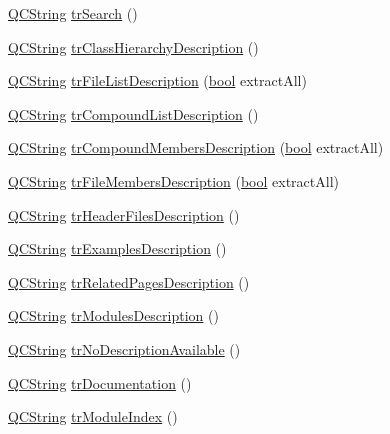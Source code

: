 \begin{DoxyCompactItemize}
\item 
\hyperlink{class_q_c_string}{Q\+C\+String} \hyperlink{class_translator_polish_abe0e787a56fad65f83063efce0ced680}{tr\+Search} ()
\item 
\hyperlink{class_q_c_string}{Q\+C\+String} \hyperlink{class_translator_polish_a853711c5e924af67e3b633ae7094fb86}{tr\+Class\+Hierarchy\+Description} ()
\item 
\hyperlink{class_q_c_string}{Q\+C\+String} \hyperlink{class_translator_polish_af5c5cd0b0e21fdd312b99ef67b923585}{tr\+File\+List\+Description} (\hyperlink{qglobal_8h_a1062901a7428fdd9c7f180f5e01ea056}{bool} extract\+All)
\item 
\hyperlink{class_q_c_string}{Q\+C\+String} \hyperlink{class_translator_polish_a778bd46cc4a34385a3ea7f12be1d8b75}{tr\+Compound\+List\+Description} ()
\item 
\hyperlink{class_q_c_string}{Q\+C\+String} \hyperlink{class_translator_polish_a91e0ccb09917a94f318d03886db20f3c}{tr\+Compound\+Members\+Description} (\hyperlink{qglobal_8h_a1062901a7428fdd9c7f180f5e01ea056}{bool} extract\+All)
\item 
\hyperlink{class_q_c_string}{Q\+C\+String} \hyperlink{class_translator_polish_a6c1c691bb7e8adf0623f93799e6e78b2}{tr\+File\+Members\+Description} (\hyperlink{qglobal_8h_a1062901a7428fdd9c7f180f5e01ea056}{bool} extract\+All)
\item 
\hyperlink{class_q_c_string}{Q\+C\+String} \hyperlink{class_translator_polish_aac416b1fd5ec343e0a3c9307b6ee1f43}{tr\+Header\+Files\+Description} ()
\item 
\hyperlink{class_q_c_string}{Q\+C\+String} \hyperlink{class_translator_polish_ab08c9c6f8e611a0d42e6984531a7259c}{tr\+Examples\+Description} ()
\item 
\hyperlink{class_q_c_string}{Q\+C\+String} \hyperlink{class_translator_polish_aaa1a0b407fe4a4f1b499392e23fcde07}{tr\+Related\+Pages\+Description} ()
\item 
\hyperlink{class_q_c_string}{Q\+C\+String} \hyperlink{class_translator_polish_af2cf868d7d5aa618ce1ddf5dca6c42b6}{tr\+Modules\+Description} ()
\item 
\hyperlink{class_q_c_string}{Q\+C\+String} \hyperlink{class_translator_polish_a78724c66bcd03325a32eeb56f2791307}{tr\+No\+Description\+Available} ()
\item 
\hyperlink{class_q_c_string}{Q\+C\+String} \hyperlink{class_translator_polish_a759d797ca0201586919dd0d6fc9e781c}{tr\+Documentation} ()
\item 
\hyperlink{class_q_c_string}{Q\+C\+String} \hyperlink{class_translator_polish_a6b8bc70d985ec1f4bdf38a23f95707e0}{tr\+Module\+Index} ()

\end{DoxyCompactItemize}
